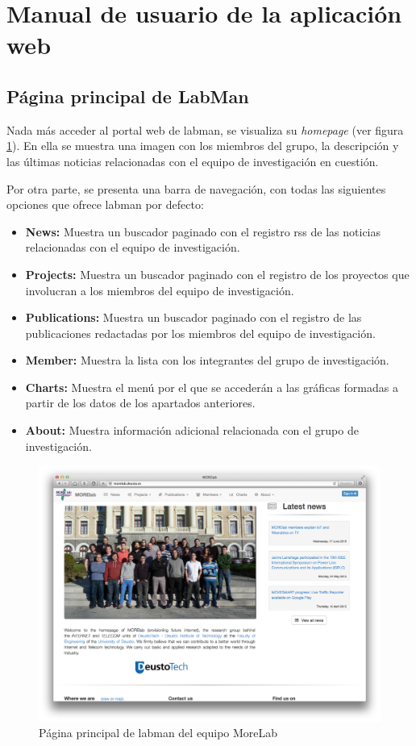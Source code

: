 \section{Manual de usuario de la aplicación web}

\subsection{Página principal de LabMan}

Nada más acceder al portal web de \acrshort{labman}, se visualiza su \textit{homepage} (ver figura \ref{fig:morelab_homepage}). En ella se muestra una imagen con los miembros del grupo, la descripción y las últimas noticias relacionadas con el equipo de investigación en cuestión.

Por otra parte, se presenta una barra de navegación, con todas las siguientes opciones que ofrece \acrshort{labman} por defecto:

\begin{itemize}
	\item \textbf{News:} Muestra un buscador paginado con el registro \acrfull{rss} de las noticias relacionadas con el equipo de investigación.
	\item \textbf{Projects:} Muestra un buscador paginado con el registro de los proyectos que involucran a los miembros del equipo de investigación.
	\item \textbf{Publications:} Muestra un buscador paginado con el registro de las publicaciones redactadas por los miembros del equipo de investigación.
	\item \textbf{Member:} Muestra la lista con los integrantes del grupo de investigación.
	\item \textbf{Charts:} Muestra el menú por el que se accederán a las gráficas formadas a partir de los datos de los apartados anteriores.
	\item \textbf{About:} Muestra información adicional relacionada con el grupo de investigación.
\end{itemize}

\begin{figure}[!htbp]
	\centering
	\includegraphics[scale=0.31]{fig/morelab_homepage}
	\caption{Página principal de \acrshort{labman} del equipo MoreLab}
	\label{fig:morelab_homepage}
\end{figure}

